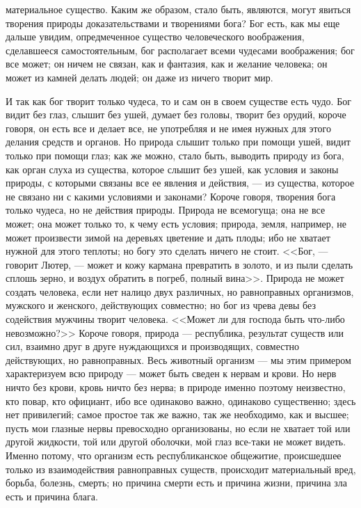\documentclass[12pt]{article}
\begin{document}
материальное существо. Каким же образом, стало быть, являются, могут явиться творения природы доказательствами и творениями бога? Бог есть, как мы еще дальше увидим, опредмеченное существо человеческого воображения, сделавшееся самостоятельным, бог располагает всеми чудесами воображения; бог все может; он ничем не связан, как и фантазия, как и желание человека; он может из камней делать людей; он даже из ничего творит мир. 

И так как бог творит только чудеса, то и сам он в своем существе есть чудо. Бог видит без глаз, слышит без ушей, думает без головы, творит без орудий, короче говоря, он есть все и делает все, не употребляя и не имея нужных для этого делания средств и органов. Но природа слышит только при помощи ушей, видит только при помощи глаз; как же можно, стало быть, выводить природу из бога, как орган слуха из существа, которое слышит без ушей, как условия и законы природы, с которыми связаны все ее явления и действия, --- из существа, которое не связано ни с какими условиями и законами? Короче говоря, творения бога только чудеса, но не действия природы. Природа не всемогуща; она не все может; она может только то, к чему есть условия; природа, земля, например, не может произвести зимой на деревьях цветение и дать плоды; ибо не хватает нужной для этого теплоты; но богу это сделать ничего не стоит. <<Бог, --- говорит Лютер, --- может и кожу кармана превратить в золото, и из пыли сделать сплошь зерно, и воздух обратить в погреб, полный вина>>. Природа не может создать человека, если нет налицо двух различных, но равноправных организмов, мужского и женского, действующих совместно; но бог из чрева девы без содействия мужчины творит человека. <<Может ли для господа быть что-либо невозможно?>> Короче говоря, природа --- республика, результат существ или сил, взаимно друг в друге нуждающихся и производящих, совместно действующих, но равноправных. Весь животный организм --- мы этим примером характеризуем всю природу --- может быть сведен к нервам и крови. Но нерв ничто без крови, кровь ничто без нерва; в природе именно поэтому неизвестно, кто повар, кто официант, ибо все одинаково важно, одинаково существенно; здесь нет привилегий; самое простое так же важно, так же необходимо, как и высшее; пусть мои глазные нервы превосходно организованы, но если не хватает той или другой жидкости, той или другой оболочки, мой глаз все-таки не может видеть. Именно потому, что организм есть республиканское общежитие, происшедшее только из взаимодействия равноправных существ, происходит материальный вред, борьба, болезнь, смерть; но причина смерти есть и причина жизни, причина зла есть и причина блага. 
\end{document}
